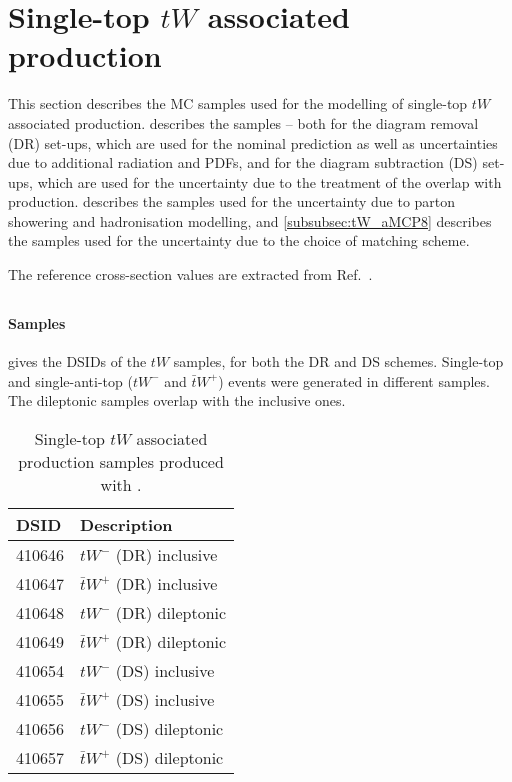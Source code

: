 
\section{Single-top \texorpdfstring{$tW$}{tW} associated production}
\label{subsec:tW}

This section describes the MC samples used for the modelling of single-top $tW$ associated production.
 describes the \POWPY[8] samples -- both for the diagram removal (DR) set-ups,
which are used for the nominal prediction as well as uncertainties due to additional radiation and PDFs,  
and for the diagram subtraction (DS) set-ups, which are used for the uncertainty due to the treatment 
of the overlap with \ttbar production. 
 describes the \POWHER[7] samples used for the uncertainty 
due to parton showering and hadronisation modelling, and \cref{subsubsec:tW_aMCP8} describes the 
\MGNLOPY[8] samples used for the uncertainty due to the choice of matching scheme.

The reference cross-section values are extracted from Ref.~\cite{LHCTopWGsgtopXsec}.

\subsection[Powheg+Pythia8]{\POWPY[8]}
\label{subsubsec:tW_PP8}

\paragraph{Samples}

 gives the DSIDs of the $tW$ \POWPY[8] samples, for both the DR and DS schemes.
Single-top and single-anti-top ($tW^-$ and $\bar{t}W^+$) events were generated in different samples.
The dileptonic samples overlap with the inclusive ones.

\begin{table}[htbp]
  \caption{Single-top $tW$ associated production samples produced with \POWPY[8].}%
  \label{tab:tW_PP8}
  \centering
  \begin{tabular}{l l}
    \toprule
    DSID & Description \\
    \midrule
    410646 & $tW^-$ (DR) inclusive \\
    410647 & $\bar{t}W^+$ (DR) inclusive \\
    410648 & $tW^-$ (DR) dileptonic \\
    410649 & $\bar{t}W^+$ (DR) dileptonic \\
    \midrule
    410654 & $tW^-$ (DS) inclusive \\
    410655 & $\bar{t}W^+$ (DS) inclusive \\
    410656 & $tW^-$ (DS) dileptonic \\
    410657 & $\bar{t}W^+$ (DS) dileptonic \\
    \bottomrule
  \end{tabular}
\end{table}

